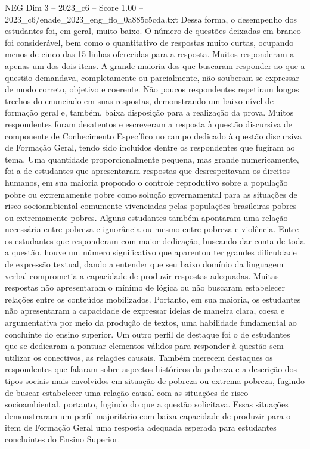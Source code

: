 \begin{textsample}{NEG Dim 3 – 2023\_c6 – Score 1.00 – 2023\_c6/enade\_2023\_eng\_flo\_0a885c5cda.txt}
Dessa forma, o desempenho dos estudantes foi, em geral, muito baixo.
O número de questões deixadas em branco foi considerável, bem como o quantitativo de respostas muito curtas, ocupando menos de cinco das 15 linhas oferecidas para a resposta.
Muitos responderam a apenas um dos dois itens.
A grande maioria dos que buscaram responder ao que a questão demandava, completamente ou parcialmente, não souberam se expressar de modo correto, objetivo e coerente.
Não poucos respondentes repetiram longos trechos do enunciado em suas respostas, demonstrando um baixo nível de formação geral e, também, baixa disposição para a realização da prova.
Muitos respondentes foram desatentos e escreveram a resposta à questão discursiva de componente de Conhecimento Específico no campo dedicado à questão discursiva de Formação Geral, tendo sido incluídos dentre os respondentes que fugiram ao tema.
Uma quantidade proporcionalmente pequena, mas grande numericamente, foi a de estudantes que apresentaram respostas que desrespeitavam os direitos humanos, em sua maioria propondo o controle reprodutivo sobre a população pobre ou extremamente pobre como solução governamental para as situações de risco socioambiental comumente vivenciadas pelas populações brasileiras pobres ou extremamente pobres.
Alguns estudantes também apontaram uma relação necessária entre pobreza e ignorância ou mesmo entre pobreza e violência.
Entre os estudantes que responderam com maior dedicação, buscando dar conta de toda a questão, houve um número significativo que aparentou ter grandes dificuldade de expressão textual, dando a entender que seu baixo domínio da linguagem verbal comprometia a capacidade de produzir respostas adequadas.
Muitas respostas não apresentaram o mínimo de lógica ou não buscaram estabelecer relações entre os conteúdos mobilizados.
Portanto, em sua maioria, os estudantes não apresentaram a capacidade de expressar ideias de maneira clara, coesa e argumentativa por meio da produção de textos, uma habilidade fundamental ao concluinte do ensino superior.
Um outro perfil de destaque foi o de estudantes que se dedicaram a pontuar elementos válidos para responder à questão sem utilizar os conectivos, as relações causais.
Também merecem destaques os respondentes que falaram sobre aspectos históricos da pobreza e a descrição dos tipos sociais mais envolvidos em situação de pobreza ou extrema pobreza, fugindo de buscar estabelecer uma relação causal com as situações de risco socioambiental, portanto, fugindo do que a questão solicitava.
Essas situações demonstraram um perfil majoritário com baixa capacidade de produzir para o item de Formação Geral uma resposta adequada esperada para estudantes concluintes do Ensino Superior.

\end{textsample}
